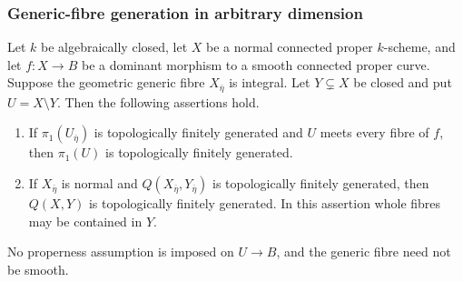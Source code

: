 \subsubsection{Generic-fibre generation in arbitrary dimension}

\begin{proposition}
\label{D:generic-fibre-generation}
Let $k$ be algebraically closed, let $X$ be a normal connected
proper $k$-scheme, and let $f:X\to B$ be a dominant morphism
to a smooth connected proper curve.  Suppose the geometric
generic fibre $X_{\overline\eta}$ is integral.  Let
$Y\subsetneq X$ be closed and put $U=X\setminus Y$.
Then the following assertions hold.
\begin{enumerate}
\item If $\pi_1(U_{\overline\eta})$ is topologically finitely
generated and $U$ meets every fibre of $f$, then $\pi_1(U)$
is topologically finitely generated.
\item If $X_{\overline\eta}$ is normal and
$Q(X_{\overline\eta},Y_{\overline\eta})$ is topologically
finitely generated, then $Q(X,Y)$ is topologically finitely
generated.  In this assertion whole fibres may be contained
in $Y$.
\end{enumerate}
No properness assumption is imposed on $U\to B$, and the
generic fibre need not be smooth.
\end{proposition}
